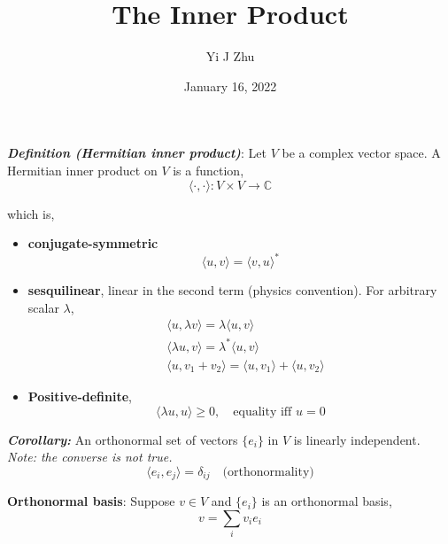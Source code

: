 \documentclass[12pt]{article}
\numberwithin{equation}{section}
\begin{document}
	\title{The Inner Product}
	\author{Yi J Zhu}
	\date{January 16, 2022}
	\maketitle

	\vspace{1cm}
	
	\textbf{\textit{Definition (Hermitian inner product)}}: Let $ V $ be a complex vector space. A Hermitian inner product on $ V $ is a function,
	\begin{equation}
			\langle \cdot,\cdot\rangle: V\times V \to \mathbb{C}
	\end{equation}

	which is,
	\begin{itemize}
		\item \textbf{conjugate-symmetric}
		\begin{equation}
				\langle u, v\rangle = \langle v,u\rangle^*
		\end{equation}
		\item \textbf{sesquilinear}, linear in the second term (physics convention). For arbitrary scalar $\lambda$,
		\begin{align}
			&\langle u,\lambda v\rangle = \lambda \langle u, v\rangle\\
			&\langle \lambda u, v\rangle = \lambda^* \langle u, v\rangle\\
			&\langle u, v_1 + v_2 \rangle = \langle  u, v_1\rangle + \langle  u, v_2\rangle
		\end{align}
		\item \textbf{Positive-definite},
		\begin{equation}
				\langle \lambda u, u\rangle \geq 0,\quad\text{equality iff }u=0
		\end{equation}
		
	\end{itemize}

	\textbf{\textit{Corollary:}} An orthonormal set of vectors $ \{e_i\} $ in $ V $ is linearly independent. \textit{Note: the converse is not true.}
	\begin{equation}
		\langle e_i, e_j\rangle = \delta_{ij}\quad \text{(orthonormality)}
	\end{equation}


\newpage

\textbf{Orthonormal basis}: Suppose $ v\in V $ and $ \{e_i\} $ is an orthonormal basis,
\begin{equation}
	v = \sum_i v_i e_i
\end{equation}
\end{document}
